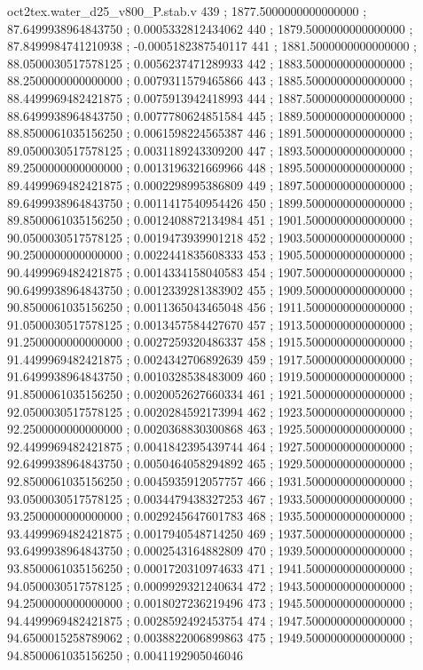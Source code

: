 \begin{filecontents}[overwrite]{oct2tex.water_d25_v800_P.stab.v}
439 ; 1877.5000000000000000 ; 87.6499938964843750 ; 0.0005332812434062
440 ; 1879.5000000000000000 ; 87.8499984741210938 ; -0.0005182387540117
441 ; 1881.5000000000000000 ; 88.0500030517578125 ; 0.0056237471289933
442 ; 1883.5000000000000000 ; 88.2500000000000000 ; 0.0079311579465866
443 ; 1885.5000000000000000 ; 88.4499969482421875 ; 0.0075913942418993
444 ; 1887.5000000000000000 ; 88.6499938964843750 ; 0.0077780624851584
445 ; 1889.5000000000000000 ; 88.8500061035156250 ; 0.0061598224565387
446 ; 1891.5000000000000000 ; 89.0500030517578125 ; 0.0031189243309200
447 ; 1893.5000000000000000 ; 89.2500000000000000 ; 0.0013196321669966
448 ; 1895.5000000000000000 ; 89.4499969482421875 ; 0.0002298995386809
449 ; 1897.5000000000000000 ; 89.6499938964843750 ; 0.0011417540954426
450 ; 1899.5000000000000000 ; 89.8500061035156250 ; 0.0012408872134984
451 ; 1901.5000000000000000 ; 90.0500030517578125 ; 0.0019473939901218
452 ; 1903.5000000000000000 ; 90.2500000000000000 ; 0.0022441835608333
453 ; 1905.5000000000000000 ; 90.4499969482421875 ; 0.0014334158040583
454 ; 1907.5000000000000000 ; 90.6499938964843750 ; 0.0012339281383902
455 ; 1909.5000000000000000 ; 90.8500061035156250 ; 0.0011365043465048
456 ; 1911.5000000000000000 ; 91.0500030517578125 ; 0.0013457584427670
457 ; 1913.5000000000000000 ; 91.2500000000000000 ; 0.0027259320486337
458 ; 1915.5000000000000000 ; 91.4499969482421875 ; 0.0024342706892639
459 ; 1917.5000000000000000 ; 91.6499938964843750 ; 0.0010328538483009
460 ; 1919.5000000000000000 ; 91.8500061035156250 ; 0.0020052627660334
461 ; 1921.5000000000000000 ; 92.0500030517578125 ; 0.0020284592173994
462 ; 1923.5000000000000000 ; 92.2500000000000000 ; 0.0020368830300868
463 ; 1925.5000000000000000 ; 92.4499969482421875 ; 0.0041842395439744
464 ; 1927.5000000000000000 ; 92.6499938964843750 ; 0.0050464058294892
465 ; 1929.5000000000000000 ; 92.8500061035156250 ; 0.0045935912057757
466 ; 1931.5000000000000000 ; 93.0500030517578125 ; 0.0034479438327253
467 ; 1933.5000000000000000 ; 93.2500000000000000 ; 0.0029245647601783
468 ; 1935.5000000000000000 ; 93.4499969482421875 ; 0.0017940548714250
469 ; 1937.5000000000000000 ; 93.6499938964843750 ; 0.0002543164882809
470 ; 1939.5000000000000000 ; 93.8500061035156250 ; 0.0001720310974633
471 ; 1941.5000000000000000 ; 94.0500030517578125 ; 0.0009929321240634
472 ; 1943.5000000000000000 ; 94.2500000000000000 ; 0.0018027236219496
473 ; 1945.5000000000000000 ; 94.4499969482421875 ; 0.0028592492453754
474 ; 1947.5000000000000000 ; 94.6500015258789062 ; 0.0038822006899863
475 ; 1949.5000000000000000 ; 94.8500061035156250 ; 0.0041192905046046

\end{filecontents}
